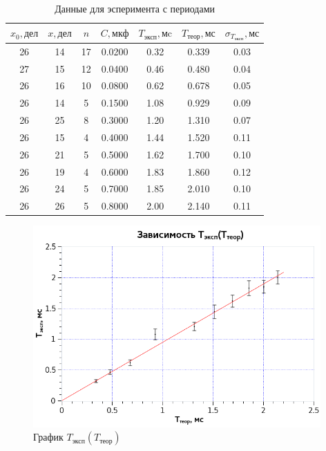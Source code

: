 \documentclass{article}
\begin{document}
   \begin{center}
   \begin{table}[h]
   \label{e1tab} 
   \centering
   \caption{Данные для эсперимента с периодами}
   \begin{tabular}{|*{7}{c|}}
   \hline 
   $x_0, \text{дел}$ & $x, \text{дел}$ & $n$ & $C, \text{мкф}$ & $T_{\text{эксп}}, \text{мc}$ & $T_{\text{теор}},\text{мс}$ & $\sigma_{T_{\text{эксп}}}, \text{мс}$\\ \hline 
   26 & 14 & 17 & 0.0200 & 0.32 & 0.339 & 0.03 \\ \hline 
   27 & 15 & 12 & 0.0400 & 0.46 & 0.480 & 0.04 \\ \hline 
   26 & 16 & 10 & 0.0800 & 0.62 & 0.678 & 0.05 \\ \hline 
   26 & 14 & 5 & 0.1500 & 1.08 & 0.929 & 0.09 \\ \hline 
   26 & 25 & 8 & 0.3000 & 1.20 & 1.310 & 0.07 \\ \hline 
   26 & 15 & 4 & 0.4000 & 1.44 & 1.520 & 0.11 \\ \hline 
   26 & 21 & 5 & 0.5000 & 1.62 & 1.700 & 0.10 \\ \hline 
   26 & 19 & 4 & 0.6000 & 1.83 & 1.860 & 0.12 \\ \hline 
   26 & 24 & 5 & 0.7000 & 1.85 & 2.010 & 0.10 \\ \hline 
   26 & 26 & 5 & 0.8000 & 2.00 & 2.140 & 0.11 \\ \hline 
   \end{tabular} 
   \end{table} 
   \end{center}
   
   \begin{figure}[h]
   \centering
   \includegraphics[width=11cm]{fig1.png} 
   \caption{График $T_{\text{эксп}}(T_{\text{теор}}) $} 
   \label{fig.1} 
   \end{figure}
\end{document}
